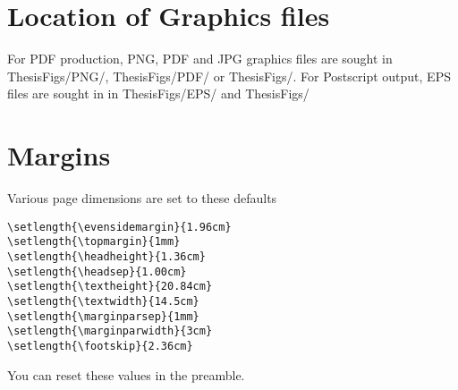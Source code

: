 \documentclass{article}
\begin{document}
\section{Location of Graphics files}
For PDF production, PNG, PDF and JPG graphics files are sought in ThesisFigs/PNG/, ThesisFigs/PDF/ or ThesisFigs/. For Postscript output, EPS files are sought in
 in ThesisFigs/EPS/ and ThesisFigs/

\section{Margins}
Various page dimensions are set to these defaults
\begin{verbatim}
\setlength{\evensidemargin}{1.96cm}
\setlength{\topmargin}{1mm}
\setlength{\headheight}{1.36cm}
\setlength{\headsep}{1.00cm}
\setlength{\textheight}{20.84cm}
\setlength{\textwidth}{14.5cm}
\setlength{\marginparsep}{1mm}
\setlength{\marginparwidth}{3cm}
\setlength{\footskip}{2.36cm}
\end{verbatim}
You can reset these values in the preamble.
\end{document}
